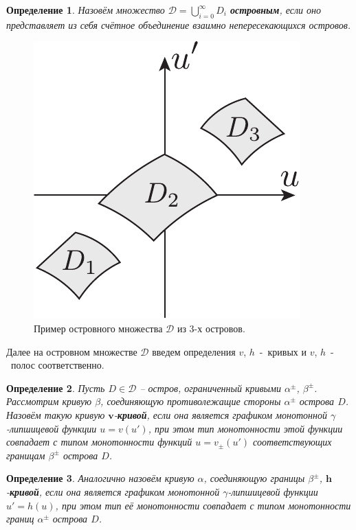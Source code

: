 \documentclass{article}
\newtheorem*{definition}{Определение}
\begin{document}
\begin{definition}
	Назовём множество $\mathcal{D} = \bigcup_{i = 0}^{\infty} D_i$ {\bf островным}, если оно представляет из себя счётное объединение взаимно непересекающихся островов.
\end{definition}

\begin{figure}[h]
\centering
  \includegraphics[scale = 0.8]{pic/set of islands}
  \caption{Пример островного множества $\mathcal{D}$ из 3-х островов.}
\label{fig:islands}
\end{figure}

Далее на островном множестве $\mathcal{D}$ введем определения $v$, $h$~-~кривых и $v$, $h$~-~полос соответственно.

\begin{definition}
	Пусть $D \in \mathcal{D}$ -- остров, ограниченный кривыми $\alpha^{\pm}$, $\beta^{\pm}$.
	Рассмотрим кривую $\beta$, соединяющую противолежащие стороны $\alpha^{\pm}$ острова $D$.
	Назовём такую кривую $\mathbf{v}$-{\bf кривой}, если она является графиком монотонной $\gamma$-липшицевой функции $u = v(u')$, при этом тип монотонности этой функции совпадает с типом монотонности функций $u = v_{\pm}(u')$ соответствующих границам $\beta^{\pm}$ острова $D$.
\end{definition}

\begin{definition}
	Аналогично назовём кривую $\alpha$, соединяющую границы $\beta^{\pm}$, $\mathbf{h}$-{\bf кривой}, если она является графиком монотонной $\gamma$-липшицевой функции $u' = h(u)$, при этом тип её монотонности совпадает с типом монотонности границ $\alpha^{\pm}$ острова $D$.
\end{definition}
\end{document}
